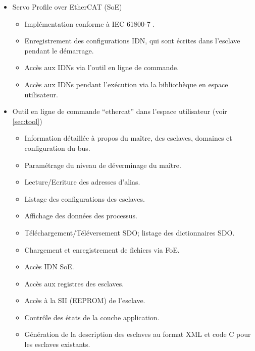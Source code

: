 \documentclass[a4paper,12pt,BCOR=6mm,bibtotoc,idxtotoc]{scrbook}
\begin{document}
\begin{itemize}
\begin{itemize}
  \end{itemize}

\item Servo Profile over EtherCAT (SoE)

  \begin{itemize}

  \item Impl\'ementation conforme \`a IEC 61800-7 \cite{soespec}.

  \item Enregistrement des configurations IDN, qui sont \'ecrites dans l'esclave pendant le d\'emarrage.

  \item Acc\`es aux IDNs via l'outil en ligne de commande.

  \item Acc\`es aux IDNs pendant l'ex\'ecution via la biblioth\`eque en espace utilisateur.

  \end{itemize}

\item Outil en ligne de commande ``ethercat'' dans l'espace
  utilisateur (voir \autoref{sec:tool})

  \begin{itemize}

  \item Information d\'etaill\'ee \`a propos du ma\^itre, des
    esclaves, domaines et configuration du bus.
  \item Param\'etrage du niveau de d\'everminage du ma\^itre.
  \item Lecture/Ecriture des adresses d'alias.
  \item Listage des configurations des esclaves.
  \item Affichage des donn\'ees des processus.
  \item T\'el\'echargement/T\'el\'eversement SDO; listage des
    dictionnaires SDO.
  \item Chargement et enregistrement de fichiers via FoE.
  \item Acc\`es IDN SoE.
  \item Acc\`es aux registres des esclaves.
  \item Acc\`es \`a la SII (EEPROM) de l'esclave.
  \item Contr\^ole des \'etats de la couche application.
  \item G\'en\'eration de la description des esclaves au format XML et
    code C pour les esclaves existants.


\end{itemize}
\end{itemize}
\end{document}

